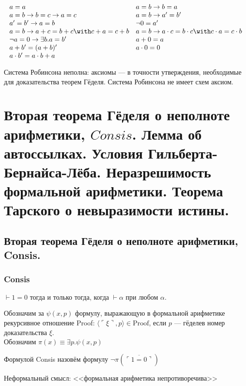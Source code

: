 \documentclass[10pt,a4paper,oneside]{article}
\begin{document}
\vspace{-0.4cm}
$$\begin{array}{ll}
a = a & a = b \rightarrow b = a \\
a = b \rightarrow b = c \rightarrow a = c & a = b \rightarrow a' = b' \\
a' = b' \rightarrow a = b & \neg 0 = a' \\
a = b \rightarrow a + c = b + c \with c + a = c + b & a = b \rightarrow a \cdot c = b \cdot c \with c \cdot a = c \cdot b \\
\neg a = 0 \rightarrow \exists b. a = b' & a + 0 = a\\
a + b' = (a + b)' & a \cdot 0 = 0 \\
a \cdot b' = a \cdot b + a 
\end{array}$$


\vspace{-0.3cm}
Система Робинсона неполна: аксиомы --- в точности утверждения, необходимые для доказательства теорем Гёделя.
Система Робинсона не имеет схем аксиом.

\section{Вторая теорема Гёделя о неполноте арифметики, $Consis$. 
Лемма об автоссылках. Условия Гильберта-Бернайса-Лёба. Неразрешимость формальной арифметики. Теорема Тарского о невыразимости истины.}

\subsection{Вторая теорема Гёделя о неполноте арифметики, Consis.}
\subsubsection{Consis}
$\vdash 1=0$ тогда и только тогда, когда $\vdash\alpha$ при любом $\alpha$.


Обозначим за $\psi(x,p)$ формулу, выражающую в формальной арифметике рекурсивное
отношение Proof: $\langle \ulcorner\xi\urcorner,p\rangle \in \text{Proof}$, если $p$ --- гёделев номер
доказательства $\xi$. \\
Обозначим $\pi(x)\equiv\exists p.\psi(x,p)$

 Формулой Consis назовём формулу
$\neg \pi(\overline{\ulcorner 1=0 \urcorner})$

\noindent Неформальный смысл: <<формальная арифметика непротиворечива>>
\end{document}
